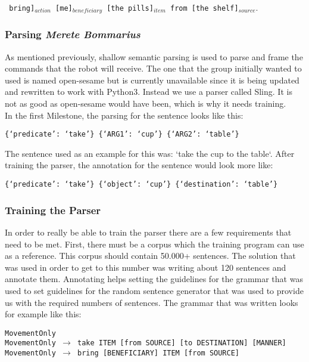 \documentclass[main.tex]{subfiles}
\begin{document}
            \texttt{ bring]$_{action}$  [me]$_{beneficiary}$ [the pills]$_{item}$ from [the shelf]$_{source}.$}
        \subsubsection{Parsing \small{\textit{Merete Bommarius}}}     
            As mentioned previously, shallow semantic parsing is used to parse and frame the commands that the robot will receive. The one that the group initially wanted to used is named open-sesame but is currently unavailable since it is being updated and rewritten to work with Python3. Instead we use a parser called Sling. It is not as good as open-sesame would have been, which is why it needs training.\\ 
            In the first Milestone, the parsing for the sentence looks like this:
    
            \begin{verbatim}
{‘predicate’: ‘take’} {‘ARG1’: ‘cup’} {‘ARG2’: ‘table’}
            \end{verbatim}
            
            The sentence used as an example for this was: ‘take the cup to the table‘. After training the parser, the annotation for the sentence would look more like:
            
            \begin{verbatim}
{‘predicate’: ‘take’} {‘object’: ‘cup’} {‘destination’: ‘table’}
            \end{verbatim}
            
        \subsubsection{Training the Parser}
            In order to really be able to train the parser there are a few requirements that need to be met. First, there must be a corpus which the training program can use as a reference. This corpus should contain 50.000+ sentences. The solution that was used in order to get to this number was writing about 120 sentences and annotate them. Annotating helps setting the guidelines for the grammar that was used to set guidelines for the random sentence generator that was used to provide us with the required numbers of sentences.
            The grammar that was written looks for example like this:
            
            
            \texttt{MovementOnly\\
                MovementOnly $\rightarrow$ take ITEM [from SOURCE] [to DESTINATION] [MANNER]\\
                MovementOnly $\rightarrow$ bring [BENEFICIARY] ITEM [from SOURCE]\\}
            
\end{document}
